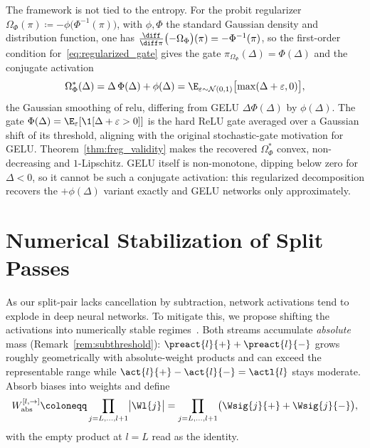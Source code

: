 \begin{remark}\label{rem:probit_gelu}
The framework is not tied to the entropy. For the probit regularizer $\Omega_\Phi(\pi) \coloneqq -\phi\bigl(\Phi^{-1}(\pi)\bigr)$, with $\phi, \Phi$ the standard Gaussian density and distribution function, one has $\frac{\diff}{\diff \pi}\bigl(-\Omega_\Phi\bigr)(\pi) = -\Phi^{-1}(\pi)$, so the first-order condition for~\eqref{eq:regularized_gate} gives the gate $\pi_{\Omega_\Phi}(\Delta) = \Phi(\Delta)$ and the conjugate activation
\begin{equation*}
	\Omega_\Phi^*(\Delta) = \Delta\, \Phi(\Delta) + \phi(\Delta) = \E_{\varepsilon \sim \mathcal{N}(0,1)}\bigl[ \max(\Delta + \varepsilon, 0) \bigr],
\end{equation*}
the Gaussian smoothing of \ac{relu}, differing from GELU $\Delta\Phi(\Delta)$ \parencite{Hendrycks2016} by $\phi(\Delta)$. The gate $\Phi(\Delta)=\E_\varepsilon[\1[\Delta+\varepsilon>0]]$ is the hard ReLU gate averaged over a Gaussian shift of its threshold, aligning with the original stochastic-gate motivation for GELU. Theorem~\ref{thm:freg_validity} makes the recovered $\Omega_\Phi^*$ convex, non-decreasing and $1$-Lipschitz. GELU itself is non-monotone, dipping below zero for $\Delta<0$, so it cannot be such a conjugate activation: this regularized decomposition recovers the $+\phi(\Delta)$ variant exactly and GELU networks only approximately.
\end{remark}

\section{Numerical Stabilization of Split Passes}\label{sec:stabilization_dc}

As our split-pair lacks cancellation by subtraction, network activations tend to explode in deep neural networks. To mitigate this, we propose shifting the activations into numerically stable regimes~\parencite{hiddenMono}. Both streams accumulate \emph{absolute} mass (Remark~\ref{rem:subthreshold}): $\preact{l}{+}+\preact{l}{-}$ grows roughly geometrically with absolute-weight products and can exceed the representable range while $\act{l}{+}-\act{l}{-}=\actl{l}$ stays moderate. Absorb biases into weights and define
\begin{equation}
	W_{\mathrm{abs}}^{[l, \rightarrow]} \coloneqq \prod_{j = L, \dots, l+1} \bigl| \Wl{j} \bigr|
	= \prod_{j = L, \dots, l+1} \bigl( \Wsig{j}{+} + \Wsig{j}{-} \bigr),
	\label{eq:w_abs}
\end{equation}
with the empty product at $l = L$ read as the identity.

